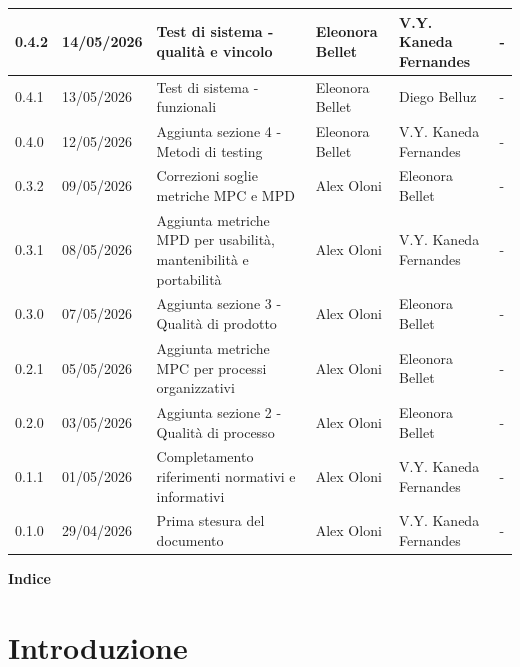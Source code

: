 \documentclass[a4paper,12pt]{article}
\begin{document}
\begin{center}
{\begin{longtable}{|p{1.4cm}|p{1.8cm}|p{5cm}|p{2.4cm}|p{2.3cm}|p{2.3cm}|}
        \hline
        0.4.2 & 14/05/2026 & Test di sistema - qualità e vincolo & Eleonora Bellet &  V.Y. Kaneda Fernandes & - \\
        \hline
        0.4.1 & 13/05/2026 & Test di sistema - funzionali & Eleonora Bellet & Diego Belluz & - \\
        \hline
        0.4.0 & 12/05/2026 & Aggiunta sezione 4 - Metodi di testing & Eleonora Bellet & V.Y. Kaneda Fernandes & - \\
        \hline
        0.3.2 & 09/05/2026 & Correzioni soglie metriche MPC e MPD & Alex Oloni & Eleonora Bellet & - \\
        \hline
        0.3.1 & 08/05/2026 & Aggiunta metriche MPD per usabilità, mantenibilità e portabilità & Alex Oloni & V.Y. Kaneda Fernandes & - \\
        \hline
        0.3.0 & 07/05/2026 & Aggiunta sezione 3 - Qualità di prodotto & Alex Oloni & Eleonora Bellet & - \\
        \hline
        0.2.1 & 05/05/2026 & Aggiunta metriche MPC per processi organizzativi & Alex Oloni & Eleonora Bellet & - \\
        \hline
        0.2.0 & 03/05/2026 & Aggiunta sezione 2 - Qualità di processo & Alex Oloni & Eleonora Bellet & - \\
        \hline
        0.1.1 & 01/05/2026 & Completamento riferimenti normativi e informativi & Alex Oloni & V.Y. Kaneda Fernandes & - \\
        \hline
        0.1.0 & 29/04/2026 & Prima stesura del documento & Alex Oloni & V.Y. Kaneda Fernandes & - \\
        \hline
    \end{longtable}
    }
\end{center}
\newpage

\begin{center} 
    {\Large \textbf{Indice}}
\end{center}

\vspace{0.6cm}

\makeatletter
{}
\makeatother

\newpage
{}
\hypersetup{pageanchor=true}
\setcounter{page}{4}

\section{Introduzione}
\end{document}
